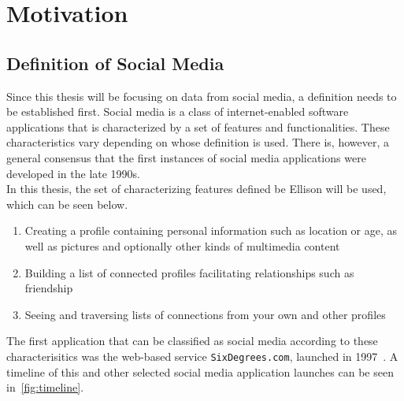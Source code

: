 
\chapter{Motivation}
\label{ch:motivation}

\section{Definition of Social Media}
\label{sec:definitionOfSocialMedia}

Since this thesis will be focusing on data from social media, a definition needs to be established first.
Social media is a class of internet-enabled software applications that is characterized by a set of features and functionalities.
These characteristics vary depending on whose definition is used.
There is, however, a general consensus that the first instances of social media applications were developed in the late 1990s.
\\
In this thesis, the set of characterizing features defined be Ellison \etAl \cite{Ellison2008} will be used, which can be seen below.

\begin{enumerate}
    \item
    Creating a profile containing personal information such as location or age, as well as pictures and optionally other kinds of multimedia content
    \item
    Building a list of connected profiles facilitating relationships such as friendship
    \item
    Seeing and traversing lists of connections from your own and other profiles
\end{enumerate}


The first application that can be classified as social media according to these characterisitics
was the web-based service \texttt{SixDegrees.com}, launched in 1997~\cite{Ellison2008}.
A timeline of this and other selected social media application launches can be seen in~\cref{fig:timeline}.

